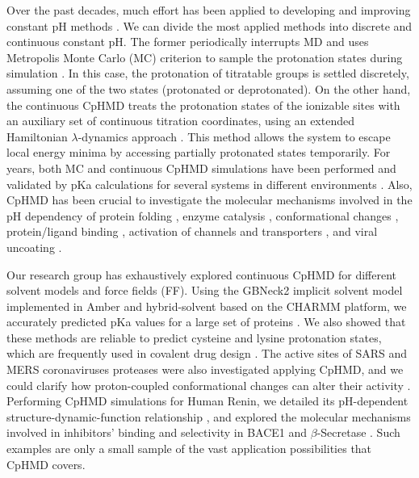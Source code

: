 \documentclass[9pt,tutorial]{livecoms}
\begin{document}
Over the past decades, much effort has been applied to developing and improving constant pH methods \cite{Chen_Shen_2014_Mol.Simulat.}. We can divide the most applied methods into discrete and continuous constant pH. The former periodically interrupts MD and uses Metropolis Monte Carlo (MC) criterion to sample the protonation states during simulation \cite{Burgi_Gunsteren_2002_ProteinsStruct.Funct.Bioinforma.}. In this case, the protonation of titratable groups is settled discretely, assuming one of the two states (protonated or deprotonated). On the other hand, the continuous CpHMD treats the protonation states of the ionizable sites with an auxiliary set of continuous titration coordinates, using an extended Hamiltonian $\lambda$-dynamics approach \cite{Chen_Shen_2014_Mol.Simulat.}. This method allows the system to escape local energy minima by accessing partially protonated states temporarily. For years, both MC and continuous CpHMD simulations have been performed and validated by pKa calculations for several systems in different environments \cite{Chen_Shen_2014_Mol.Simulat.,Radak_Roux_2017_J.Chem.TheoryComput.}. Also, CpHMD has been crucial to investigate the molecular mechanisms involved in the pH dependency of protein folding \cite{MartinsdeOliveira_PereiraLeite_2018_BiophysicalJournal,Yue_Shen_2018_Phys.Chem.Chem.Phys.}, enzyme catalysis \cite{Huang_Shen_2018_J.Phys.Chem.Lett.}, conformational changes \cite{Sarkar_Roitberg_2020_J.Phys.Chem.B}, protein/ligand binding \cite{Ellis_Shen_2016_J.Phys.Chem.Lett.,Harris_Shen_2017_J.Phys.Chem.Lett.}, activation of channels and transporters \cite{Huang_Shen_2020_}, and viral uncoating \cite{Chen_Shen_2016_J.Phys.Chem.Lett.}. 

Our research group has exhaustively explored continuous CpHMD for different solvent models and force fields (FF). Using the GBNeck2 implicit solvent model implemented in Amber and hybrid-solvent based on the CHARMM platform, we accurately predicted pKa values for a large set of proteins \cite{Huang_Shen_2018_J.Chem.Inf.Model.,Harris_Shen_2019_J.Chem.Inf.Model.}. We also showed that these methods are reliable to predict cysteine and lysine protonation states, which are frequently used in covalent drug design \cite{Liu_Shen_2019_J.Am.Chem.Soc.,Harris_Shen_2020_J.Chem.TheoryComput.}. The active sites of SARS and MERS coronaviruses proteases were also investigated applying CpHMD, and we could clarify how proton-coupled conformational changes can alter their activity \cite{Verma_Shen_2020_J.Am.Chem.Soc.,Henderson_Shen_2020_J.Chem.Phys.}. Performing CpHMD simulations for Human Renin, we detailed its pH-dependent structure-dynamic-function relationship \cite{Ma_Shen_2020_J.Chem.Inf.Model.}, and explored the molecular mechanisms involved in inhibitors' binding and selectivity in BACE1 and $\beta$-Secretase \cite{Ellis_Shen_2015_J.Am.Chem.Soc.,Ellis_Shen_2016_J.Phys.Chem.Lett.,Harris_Shen_2017_J.Phys.Chem.Lett.}. Such examples are only a small sample of the vast application possibilities that CpHMD covers.
\end{document}
